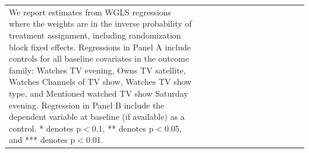 \documentclass[12pt]{article}
\begin{document}
\begin{table}
\begin{tabular}{@{\extracolsep{0pt}}lccccccccccccc}
{{We report estimates from WGLS regressions where the weights are in the inverse probability of treatment 
assignment, including randomization block fixed effects. 
Regressions in Panel A include controls for all baseline covariates in the outcome family: 
Watches TV evening, Owns TV satellite, Watches Channels of TV show, 
Watches TV show type, and Mentioned watched TV show Saturday evening. 
Regression in Panel B include the dependent variable at baseline (if available) as a control. 
* denotes p$<$0.1, ** denotes p$<$0.05, and *** denotes p$<$0.01.}} \\
\end{tabular} 
\end{table}




\clearpage
\end{document}
